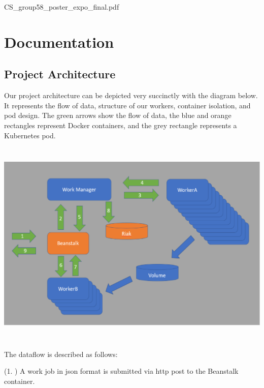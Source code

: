 \documentclass[onecolumn, draftclsnofoot,10pt, compsoc]{IEEEtran}
\begin{document}


{CS_group58_poster_expo_final.pdf}



\section{Documentation}

\subsection{Project Architecture}
Our project architecture can be depicted very succinctly with the diagram below. It represents the flow of data, structure of our workers, container isolation, and pod design. The green arrows show the flow of data, the blue and orange rectangles represent Docker containers, and the grey rectangle represents a Kubernetes pod. 
\begin{center}
    \includegraphics[width=\textwidth, height=10cm]{ProjectFlow.eps}
\end{center}
The dataflow is described as follows:

(1. ) A work job in json format is submitted via http post to the Beanstalk container.
\end{document}
